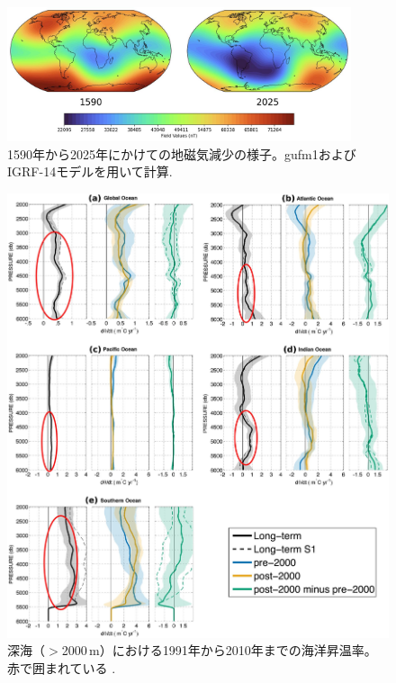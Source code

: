 \documentclass[10pt,twocolumn,letterpaper]{article}
\begin{document}
\begin{figure}[t]
\begin{center}
\includegraphics[width=0.9\textwidth]{saa.jpg}
\end{center}
   \caption{1590年から2025年にかけての地磁気減少の様子。gufm1およびIGRF-14モデルを用いて計算\cite{125,126}.}
\label{fig:14}
\end{figure}

\begin{figure}[t]
\begin{center}
   \includegraphics[width=1\linewidth]{ocean-highlight.jpg}
\end{center}
   \caption{深海（$>$2000\,m）における1991年から2010年までの海洋昇温率。赤で囲まれている \cite{132}.}
\label{fig:15}
\label{fig:onecol}
\end{figure}
\end{document}
